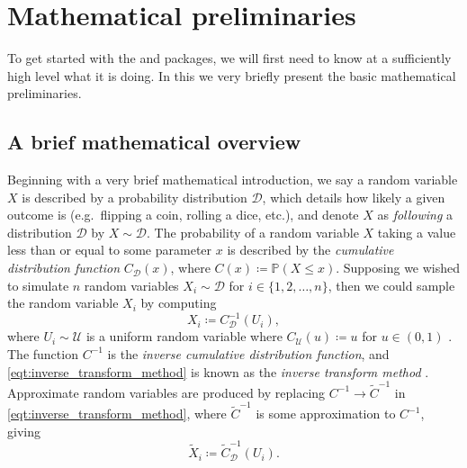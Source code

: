 \section{Mathematical preliminaries}
\label{sec:mathematical_preliminaries}

To get started with the \arv and \pyarv packages, we will first need to know at a sufficiently high level what \arv it is doing.
In this  we very briefly present the basic mathematical preliminaries. 

\subsection{A brief mathematical overview}
\label{sec:a_brief_mathematical_overview}

Beginning with a very brief mathematical introduction, we say a random variable \( X \) is described by a probability distribution \( \mathcal{D} \), which details how likely a given outcome is (e.g.\ flipping a coin, rolling a dice, etc.), and denote \( X \) as \textit{following} a distribution \( \mathcal{D} \) by \( X \sim \mathcal{D} \). The probability of a random variable \( X \) taking a value less than or equal to some parameter \( x \)  is described by the \textit{cumulative distribution function} \( C_{\mathcal{D}}(x) \), where \( C(x) \coloneqq \mathbb{P}(X \leq x) \). Supposing we wished to simulate \( n \) random variables \( X_i \sim \mathcal{D} \) for \( i \in \{1,2,\ldots,n\} \), then we could sample the random variable \( X_i \) by computing 
\begin{equation}
\label{eqt:inverse_transform_method}
X_i \coloneq C_{\mathcal{D}}^{-1}(U_i),
\end{equation}
where \( U_i \sim \mathcal{U} \) is a uniform random variable where \( C_{\mathcal{U}}(u) \coloneqq u \) for \( u \in (0, 1) \) \citep[\S\,3.4.1.B]{knuth2019art_semi}. The function \( C^{-1} \) is the \textit{inverse cumulative distribution function}, and \cref{eqt:inverse_transform_method} is known as the \textit{inverse transform method} \citep[\S\,2.2.1]{glasserman2003monte}. Approximate random variables are produced by replacing \( C^{-1} \to \widetilde{C}^{-1} \) in \cref{eqt:inverse_transform_method}, where \( \widetilde{C}^{-1} \) is some approximation to \( C^{-1} \), giving
\begin{equation}
\label{eqt:approximate_inverse_transform_method}
\widetilde{X}_i \coloneq \widetilde{C}_{\mathcal{D}}^{-1}(U_i).
\end{equation} 
